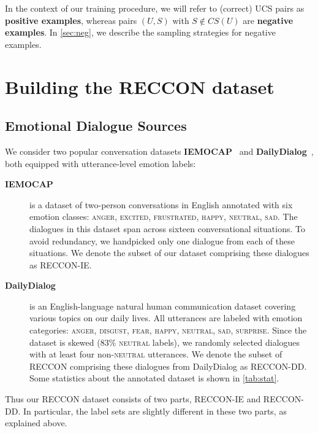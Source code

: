 \documentclass[smallextended]{svjour3}
\newcommand\emo[1]{\textsc{#1}}
\newcommand\RECCONDA{RECCON}
\newcommand\RECCONDADD{RECCON-DD}
\newcommand\RECCONDAIE{RECCON-IE}
\newcommand\DailyDialog{Daily\-Dialog}
\newcommand\0{\hphantom{0}}
\begin{document}
In the context of our training procedure, we will refer to (correct) UCS pairs as \textbf{positive 
examples}, whereas pairs $(U, S)$ with $S\notin CS(U)$ are  \textbf{negative
examples}.
In \cref{sec:neg}, we describe the sampling strategies for negative examples.







\section{Building the \RECCONDA{} dataset}\label{sec:dataset}

\subsection{Emotional Dialogue Sources}
We consider two popular conversation datasets \textbf{IEMOCAP}~\cite{iemocap} and \textbf{\DailyDialog{}}~\cite{li2017DailyDialog}, both equipped with utterance-level emotion labels:



\begin{description}
\item[\textbf{IEMOCAP}] is a dataset of two-person conversations in English annotated with six emotion classes: \emo{anger}, \emo{excited}, \emo{frustrated}, \emo{happy}, \emo{neutral}, 
\emo{sad}. The dialogues in this dataset span across sixteen 
conversational situations. To avoid redundancy, we handpicked only one dialogue from each of these situations. We denote the subset of our 
dataset comprising these dialogues as 
\RECCONDAIE{}.

\item[\textbf{\DailyDialog{}}] is an English-language natural human communication dataset covering various topics on our daily lives. All utterances are labeled with emotion categories: \emo{anger}, \emo{disgust}, \emo{fear}, \emo{happy}, \emo{neutral}, \emo{sad}, 
\emo{surprise}. Since the dataset is skewed 
($83\%$ \emo{neutral} labels),
we randomly selected dialogues 
with
at least four non-\emo{neutral} utterances. We denote the subset of \RECCONDA{} comprising these dialogues from \DailyDialog{} as \RECCONDADD. Some statistics about the annotated dataset is shown in \cref{tab:stat}.
\end{description}
Thus our RECCON dataset consists of two parts, \RECCONDAIE{} and \RECCONDADD{}. In particular, the label sets are slightly different in these two parts, as explained above.
\end{document}
